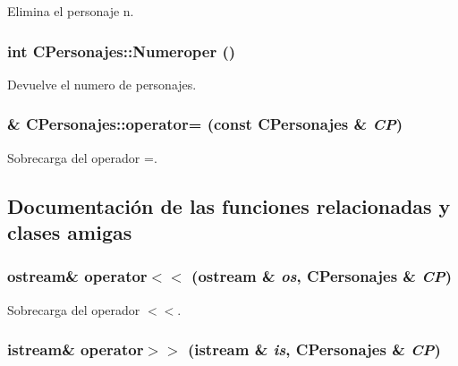 Elimina el personaje n. 

\hypertarget{class_c_personajes_90a3e2265d8b8800ccb322bdb8927566}{
\subsubsection[{Numeroper}]{\setlength{\rightskip}{0pt plus 5cm}int CPersonajes::Numeroper ()}}
\label{class_c_personajes_90a3e2265d8b8800ccb322bdb8927566}


Devuelve el numero de personajes. 

\hypertarget{class_c_personajes_76356e18c65e246be804711ad481e2e4}{
\subsubsection[{operator=}]{ \& CPersonajes::operator= (const {\bf CPersonajes} \& {\em CP})}}
\label{class_c_personajes_76356e18c65e246be804711ad481e2e4}


Sobrecarga del operador =. 



\subsection{Documentación de las funciones relacionadas y clases amigas}
\hypertarget{class_c_personajes_bdc717e962d38d0b04d8fc86b0fd0afc}{
\subsubsection[{operator$<$$<$}]{\setlength{\rightskip}{0pt plus 5cm}ostream\& operator$<$$<$ (ostream \& {\em os}, \/  {\bf CPersonajes} \& {\em CP})}}
\label{class_c_personajes_bdc717e962d38d0b04d8fc86b0fd0afc}


Sobrecarga del operador $<$$<$. 

\hypertarget{class_c_personajes_4456215e5677663ee76f95b40e2ae502}{
\subsubsection[{operator$>$$>$}]{\setlength{\rightskip}{0pt plus 5cm}istream\& operator$>$$>$ (istream \& {\em is}, \/  {\bf CPersonajes} \& {\em CP})}}
\label{class_c_personajes_4456215e5677663ee76f95b40e2ae502}


